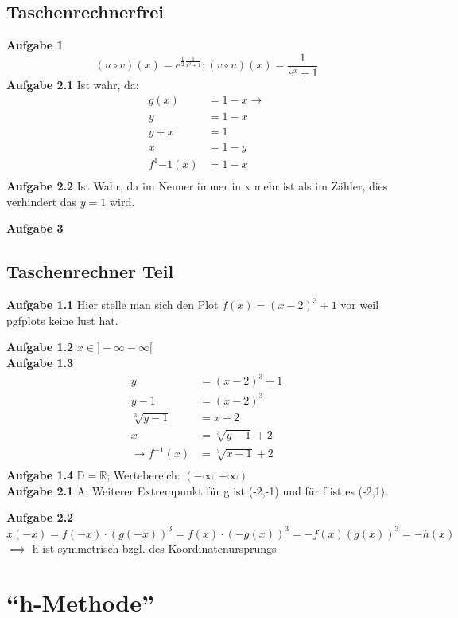 \documentclass{book}
\begin{document}
\subsection*{Taschenrechnerfrei}
\textbf{Aufgabe 1}
\[(u\circ v)(x)=e^{\frac{1}{2}\frac{1}{x^2+1}} ; (v\circ u)(x)=\frac{1}{e^x+1} \]
\textbf{Aufgabe 2.1}
Ist wahr, da:
\begin{align*}
    g(x) & =1-x  \to\\
        y &= 1-x\\
        y+x & = 1\\
        x & = 1-y\\
        f^1{-1}(x) & =1-x\\
\end{align*}
\textbf{Aufgabe 2.2}
Ist Wahr, da im Nenner immer in x mehr ist als im Zähler, dies verhindert das $y=1$ wird.

\noindent\textbf{Aufgabe 3}
\subsection*{Taschenrechner Teil}
\textbf{Aufgabe 1.1}
Hier stelle man sich den Plot $f(x)=(x-2)^3+1$ vor weil pgfplots keine lust hat.

\noindent \textbf{Aufgabe 1.2} $x \in ]-\infty-\infty[$\\
\noindent \textbf{Aufgabe 1.3}
\begin{align*}
   y&= (x-2)^3+1 \\ 
   y-1&= (x-2)^3 \\
   \sqrt[3]{y-1}&= x-2 \\ 
   x&=\sqrt[3]{y-1}+2 \\
   \to f^{-1}(x)&= \sqrt[3]{x-1}+2\\
\end{align*}
\textbf{Aufgabe 1.4} $\mathbb{D}=\mathbb{R}$; Wertebereich: $(-\infty;+\infty)$\\
\textbf{Aufgabe 2.1} 
A: Weiterer Extrempunkt für g ist (-2,-1) und für f ist es (-2,1).

\noindent\textbf{Aufgabe 2.2}
\[x(-x)=f(-x)\cdot (g(-x))^3=f(x)\cdot (-g(x))^3=-f(x)(g(x))^3=-h(x)\]
$\implies$ h ist symmetrisch bzgl. des Koordinatenursprungs
\clearpage%

\section{``h-Methode''}
\end{document}
